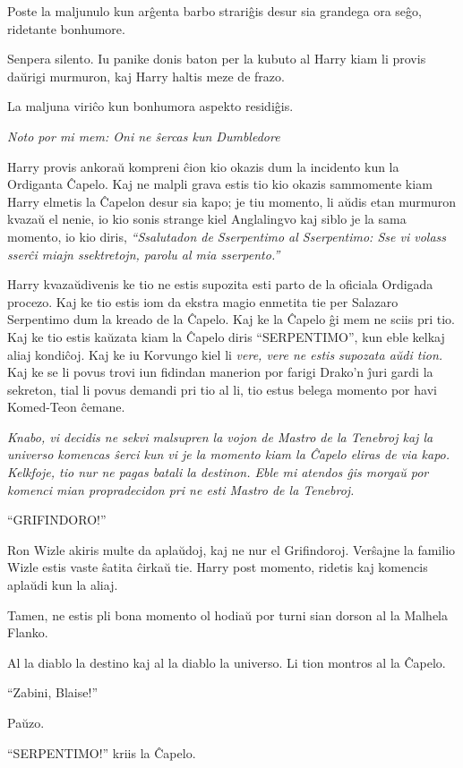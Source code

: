 Poste la maljunulo kun arĝenta barbo strariĝis desur sia grandega ora
seĝo, ridetante bonhumore.

Senpera silento. Iu panike donis baton per la kubuto al Harry kiam li
provis daŭrigi murmuron, kaj Harry haltis meze de frazo.

La maljuna viriĉo kun bonhumora aspekto residiĝis.

\emph{Noto por mi mem: Oni ne ŝercas kun Dumbledore}

Harry provis ankoraŭ kompreni ĉion kio okazis dum la incidento kun la
Ordiganta Ĉapelo. Kaj ne malpli grava estis tio kio okazis sammomente
kiam Harry elmetis la Ĉapelon desur sia kapo; je tiu momento, li aŭdis
etan murmuron kvazaŭ el nenie, io kio sonis strange kiel Anglalingvo
kaj siblo je la sama momento, io kio diris, \emph{``Ssalutadon de
  Sserpentimo al Sserpentimo: Sse vi volass sserĉi miajn ssektretojn,
  parolu al mia sserpento.''}

Harry kvazaŭdivenis ke tio ne estis supozita esti parto de la oficiala
Ordigada procezo. Kaj ke tio estis iom da ekstra magio enmetita tie
per Salazaro Serpentimo dum la kreado de la Ĉapelo. Kaj ke la Ĉapelo
ĝi mem ne sciis pri tio. Kaj ke tio estis kaŭzata kiam la Ĉapelo diris
``SERPENTIMO'', kun eble kelkaj aliaj kondiĉoj. Kaj ke iu Korvungo
kiel li \emph{vere, vere ne estis supozata aŭdi tion.}  Kaj ke se li
povus trovi iun fidindan manerion por farigi Drako'n ĵuri gardi la
sekreton, tial li povus demandi pri tio al li, tio estus belega
momento por havi Komed-Teon ĉemane.

\emph{Knabo, vi decidis ne sekvi malsupren la vojon de Mastro de la
  Tenebroj kaj la universo komencas ŝerci kun vi je la momento kiam la
  Ĉapelo eliras de via kapo. Kelkfoje, tio nur ne pagas batali la
  destinon. Eble mi atendos ĝis morgaŭ por komenci mian propradecidon
  pri ne esti Mastro de la Tenebroj.}

``GRIFINDORO!''

Ron Wizle akiris multe da aplaŭdoj, kaj ne nur el
Grifindoroj. Verŝajne la familio Wizle estis vaste ŝatita ĉirkaŭ
tie. Harry post momento, ridetis kaj komencis aplaŭdi kun la aliaj.

Tamen, ne estis pli bona momento ol hodiaŭ por turni sian dorson al la
Malhela Flanko.

Al la diablo la destino kaj al la diablo la universo. Li tion montros
al la Ĉapelo.

``Zabini, Blaise!''

Paŭzo.

``SERPENTIMO!'' kriis la Ĉapelo.


